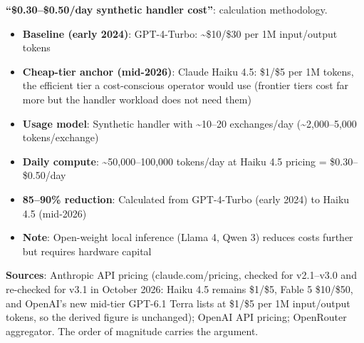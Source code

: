 \documentclass[11pt,letterpaper]{article}
\begin{document}
\textbf{``\$0.30--\$0.50/day synthetic handler cost''}: calculation methodology.
\begin{itemize}
  \item \textbf{Baseline (early 2024)}: GPT-4-Turbo: \~{}\$10/\$30 per 1M input/output tokens
  \item \textbf{Cheap-tier anchor (mid-2026)}: Claude Haiku 4.5: \$1/\$5 per 1M tokens, the efficient tier a cost-conscious operator would use (frontier tiers cost far more but the handler workload does not need them)
  \item \textbf{Usage model}: Synthetic handler with \~{}10--20 exchanges/day (\~{}2,000--5,000 tokens/exchange)
  \item \textbf{Daily compute}: \~{}50,000--100,000 tokens/day at Haiku 4.5 pricing = \$0.30--\$0.50/day
  \item \textbf{85--90\% reduction}: Calculated from GPT-4-Turbo (early 2024) to Haiku 4.5 (mid-2026)
  \item \textbf{Note}: Open-weight local inference (Llama 4, Qwen 3) reduces costs further but requires hardware capital
\end{itemize}

\textbf{Sources}: Anthropic API pricing (claude.com/pricing, checked for v2.1--v3.0 and re-checked for v3.1 in October 2026: Haiku 4.5 remains \$1/\$5, Fable 5 \$10/\$50, and OpenAI's new mid-tier GPT-6.1 Terra lists at \$1/\$5 per 1M input/output tokens, so the derived figure is unchanged); OpenAI API pricing; OpenRouter aggregator. The order of magnitude carries the argument.
\end{document}
